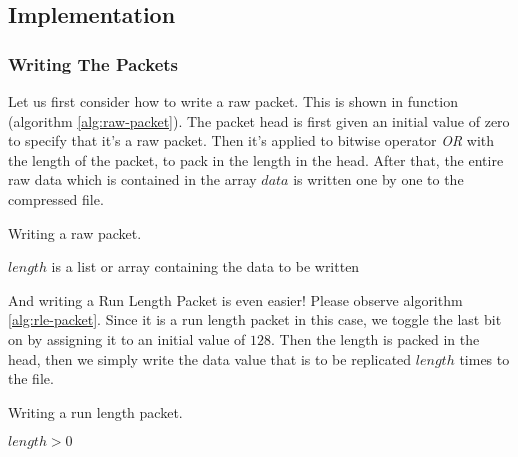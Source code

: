 \begin{refsection}
\subsection{Implementation}
\label{sec:packbits-implementation}

\subsubsection{Writing The Packets}
\label{sec:writing-packets}

Let us first consider how to write a raw packet. This is shown in
function (algorithm
\ref{alg:raw-packet}). The packet head is first given an initial value
of zero to specify that it's a raw packet. Then it's applied to
bitwise operator \textit{OR} with the length of the packet, to pack in
the length in the head. After that, the entire raw data which is
contained in the array $data$ is written one by one to the compressed file.

\begin{algorithm}
  \caption{Writing a raw packet.}
  \label{alg:raw-packet}
  \begin{algorithmic}[1]
    \Require $length$ is a list or array containing the data to be written
      \State {}
        \State {}
      \EndForEach
    \EndFunction
  \end{algorithmic}
\end{algorithm}

And writing a Run Length Packet is even easier! Please observe
algorithm \ref{alg:rle-packet}. Since it is a run length packet in
this case, we toggle the last bit on by assigning it to an initial
value of $128$. Then the length is packed in the head, then we simply
write the data value that is to be replicated $length$ times to the
file.

\begin{algorithm}
  \caption{Writing a run length packet.}
  \label{alg:rle-packet}
  \begin{algorithmic}[1]
    \Require $length > 0$
      \State {}
      \State {}
    \EndFunction
  \end{algorithmic}
\end{algorithm}


\end{refsection}

